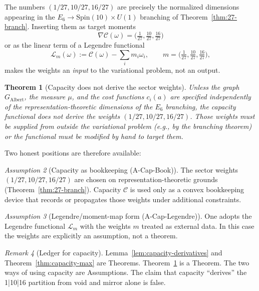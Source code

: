 \documentclass[11pt]{article}
\theoremstyle{plain}
\newtheorem{theorem}{Theorem}[section]
\theoremstyle{definition}
\theoremstyle{remark}
\newtheorem{remark}[theorem]{Remark}
\newtheorem{assumption}[theorem]{Assumption}
\numberwithin{equation}{section}
\newcommand{\Spin}{\mathrm{Spin}}
\newcommand{\capacity}{\mathcal{C}}
\begin{document}
The numbers $(1/27,10/27,16/27)$ are precisely the normalized dimensions appearing in the $E_6\to\Spin(10)\times U(1)$ branching of Theorem~\ref{thm:27-branch}. Inserting them as target moments
\[
\nabla\capacity(\omega) = \bigl(\tfrac1{27},\tfrac{10}{27},\tfrac{16}{27}\bigr)
\]
or as the linear term of a Legendre functional
\[
\mathcal{L}_m(\omega) := \capacity(\omega) - \sum_i m_i\omega_i,\qquad m = \bigl(\tfrac1{27},\tfrac{10}{27},\tfrac{16}{27}\bigr),
\]
makes the weights an \emph{input} to the variational problem, not an output.

\begin{theorem}[Capacity does not derive the sector weights]\label{thm:capacity-not-derived}
Unless the graph $G_{\mathrm{Albert}}$, the measure $\mu$, and the cost functions $c_i(a)$ are specified independently of the representation-theoretic dimensions of the $E_6$ branching, the capacity functional does not derive the weights $(1/27,10/27,16/27)$. Those weights must be supplied from outside the variational problem (e.g., by the branching theorem) or the functional must be modified by hand to target them.
\end{theorem}

Two honest positions are therefore available:

\begin{assumption}[Capacity as bookkeeping (A-Cap-Book)]
The sector weights $(1/27,10/27,16/27)$ are chosen on representation-theoretic grounds (Theorem~\ref{thm:27-branch}). Capacity $\capacity$ is used only as a convex bookkeeping device that records or propagates those weights under additional constraints.
\end{assumption}

\begin{assumption}[Legendre/moment-map form (A-Cap-Legendre)]
One adopts the Legendre functional $\mathcal{L}_m$ with the weights $m$ treated as external data. In this case the weights are explicitly an assumption, not a theorem.
\end{assumption}

\begin{remark}[Ledger for capacity]
Lemma~\ref{lem:capacity-derivatives} and Theorem~\ref{thm:capacity-max} are Theorems. Theorem~\ref{thm:capacity-not-derived} is a Theorem. The two ways of using capacity are Assumptions. The claim that capacity ``derives'' the 1|10|16 partition from void and mirror alone is false.
\end{remark}

\end{document}
